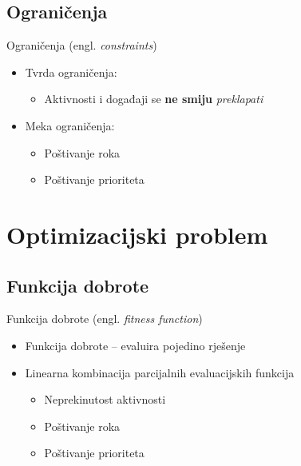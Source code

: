 \documentclass{beamer}
\begin{document}
\subsection{Ograničenja}

\begin{frame}{Ograničenja (engl. \textit{constraints})}
  \begin{itemize}
    \item {Tvrda ograničenja:}
    \begin{itemize}
      \item {Aktivnosti i događaji se \textbf{ne smiju} \textit{preklapati}}
    \end{itemize}
  \end{itemize}
  
  \begin{itemize}
    \item {Meka ograničenja:}
    \begin{itemize}
      \item {Poštivanje roka}
      \item {Poštivanje prioriteta}
    \end{itemize}
  \end{itemize}
\end{frame}

\section{Optimizacijski problem}

\subsection{Funkcija dobrote}
\begin{frame}{Funkcija dobrote (engl. \textit{fitness function})}
  \begin{itemize}
    \item {Funkcija dobrote -- evaluira pojedino rješenje}
    \item {Linearna kombinacija parcijalnih evaluacijskih funkcija}
    
    \begin{itemize}
      \item {Neprekinutost aktivnosti}
      \item {Poštivanje roka}
      \item {Poštivanje prioriteta}
    \end{itemize}
  \end{itemize}
\end{frame}
\end{document}

